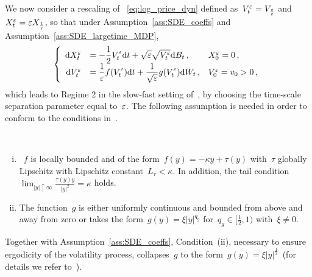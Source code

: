 We now consider a rescaling of ~\eqref{eq:log_price_dyn}
defined as~$V_t^\varepsilon = V_{\frac{t}{\varepsilon}}$ and~$X_t^\varepsilon = \varepsilon X_{\frac{t}{\varepsilon}}$, so that under Assumption~\ref{ass:SDE_coeffs} and Assumption~\ref{ass:SDE_largetime_MDP},
\begin{equation}\label{eq:large_time_MD_dynamics}
\left\{
\begin{array}{rll}
\mathrm{d} X^\varepsilon_t &= \displaystyle -\frac{1}{2}V_t^\varepsilon \mathrm{d} t + \sqrt{\varepsilon}\sqrt{V_t^\varepsilon}\mathrm{d} B_t\,, 
& X_0^\varepsilon = 0\,, \\
\mathrm{d} V_t^\varepsilon &= \displaystyle \frac{1}{\varepsilon}f(V_t^\varepsilon)\mathrm{d} t + \frac{1}{\sqrt{\varepsilon}}g(V_t^\varepsilon)\mathrm{d} W_t\,, 
& V_0^\varepsilon = v_0>0\,,
\end{array}
\right.\end{equation}
which leads to Regime 2 in the slow-fast setting of~\cite[Theorem 2.1]{Morse2017ModerateDiffusions}, 
by choosing the time-scale separation parameter equal to~$\varepsilon$. The following assumption is needed in order to conform to the conditions in~\cite{Morse2017ModerateDiffusions}.
\begin{assumption}\label{ass:SDE_largetime_MDP}\
\begin{enumerate}[(i)]
    \item~$f$ is locally bounded and of the form~$f(y) = -\kappa y +\tau(y)$ with~$\tau$ globally Lipschitz with Lipschitz constant~$L_{\tau}<\kappa$. In addition, the tail condition~${\lim_{|y| \uparrow\infty}\frac{\tau(y)y}{|y|^2} = \kappa}$ holds.
    \item The function~$g$ is either uniformly continuous and bounded from above and away from zero or takes the form~$g(y) = \xi |y|^{q_g}$ for~$q_g \in [\frac{1}{2},1)$ with~$\xi\ne 0$.
\end{enumerate}
\end{assumption}
\begin{remark}
Together with Assumption~\ref{ass:SDE_coeffs}, 
Condition~(ii), necessary to ensure ergodicity of the volatility process, collapses~$g$ to the form~$g(y)=\xi |y|^\frac{1}{2}\,$ (for details we refer to~\cite{Jacquier2019PathwisePricing,Morse2017ModerateDiffusions}).
\end{remark}

